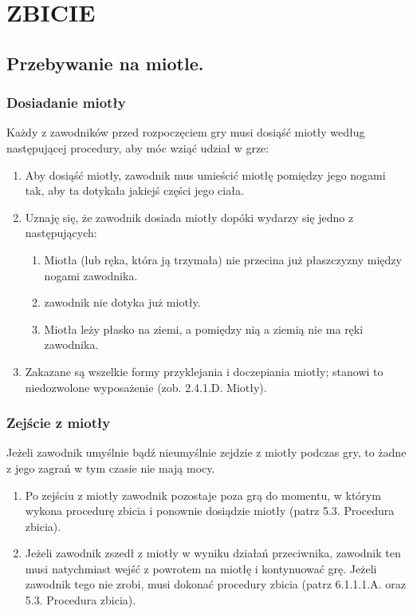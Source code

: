 \documentclass[12pt]{article}
\begin{document}
\pagebreak
\section{ZBICIE}

\subsection{Przebywanie na miotle.}

\subsubsection{Dosiadanie miotły}

Każdy z zawodników przed rozpoczęciem gry musi dosiąść miotły według
następującej procedury, aby móc wziąć udział w grze:

\begin{enumerate}
	\item
	      Aby dosiąść miotły, zawodnik mus umieścić miotłę pomiędzy jego nogami
	      tak, aby ta dotykała jakiejś części jego ciała.
	\item
	      Uznaję się, że zawodnik dosiada miotły dopóki wydarzy się jedno z
	      następujących:

	      \begin{enumerate}
		      \item
		            Miotła (lub ręka, która ją trzymała) nie przecina już płaszczyzny
		            między nogami zawodnika.
		      \item
		            zawodnik nie dotyka już miotły.
		      \item
		            Miotła leży płasko na ziemi, a pomiędzy nią a ziemią nie ma ręki
		            zawodnika.
	      \end{enumerate}
	\item
	      Zakazane są wszelkie formy przyklejania i doczepiania miotły; stanowi
	      to niedozwolone wyposażenie (zob. 2.4.1.D. Miotły).
\end{enumerate}

\subsubsection{Zejście z miotły}

Jeżeli zawodnik umyślnie bądź nieumyślnie zejdzie z miotły podczas gry,
to żadne z jego zagrań w tym czasie nie mają mocy.

\begin{enumerate}
	\item
	      Po zejściu z miotły zawodnik pozostaje poza grą do momentu, w którym
	      wykona procedurę zbicia i ponownie dosiądzie miotły (patrz 5.3.
	      Procedura zbicia).
	\item
	      Jeżeli zawodnik zszedł z miotły w wyniku działań przeciwnika, zawodnik
	      ten musi natychmiast wejść z powrotem na miotłę i kontynuować grę.
	      Jeżeli zawodnik tego nie zrobi, musi dokonać procedury zbicia (patrz
	      6.1.1.1.A. oraz 5.3. Procedura zbicia).
\end{enumerate}
\end{document}
